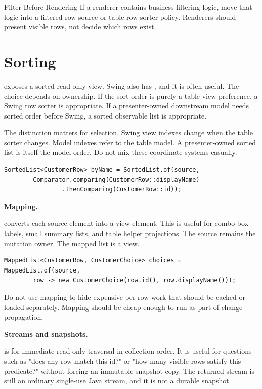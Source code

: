 \begin{migrationbox}{Filter Before Rendering}
If a renderer contains business filtering logic, move that logic into a filtered
row source or table row sorter policy. Renderers should present visible rows,
not decide which rows exist.
\end{migrationbox}

\section{Sorting}

 exposes a sorted read-only view. Swing also has
, and it is often useful. The choice depends on ownership. If the
sort order is purely a table-view preference, a Swing row sorter is appropriate.
If a presenter-owned downstream model needs sorted order before Swing, a sorted
observable list is appropriate.

The distinction matters for selection. Swing view indexes change when the table
sorter changes. Model indexes refer to the table model. A presenter-owned sorted
list is itself the model order. Do not mix these coordinate systems casually.

\begin{lstlisting}[caption={Sorted view for presenter-owned order.}]
SortedList<CustomerRow> byName = SortedList.of(source,
        Comparator.comparing(CustomerRow::displayName)
                .thenComparing(CustomerRow::id));
\end{lstlisting}

\textbf{Mapping.}

 converts each source element into a view element. This is
useful for combo-box labels, small summary lists, and table helper projections.
The source remains the mutation owner. The mapped list is a view.

\begin{lstlisting}[caption={Mapping rows to display choices.}]
MappedList<CustomerRow, CustomerChoice> choices = MappedList.of(source,
        row -> new CustomerChoice(row.id(), row.displayName()));
\end{lstlisting}

Do not use mapping to hide expensive per-row work that should be cached or
loaded separately. Mapping should be cheap enough to run as part of change
propagation.

\textbf{Streams and snapshots.}

 is for immediate read-only
traversal in collection order. It is useful for questions such as "does any row
match this id?" or "how many visible rows satisfy this predicate?" without
forcing an immutable snapshot copy. The returned stream is still an ordinary
single-use Java stream, and it is not a durable snapshot.

